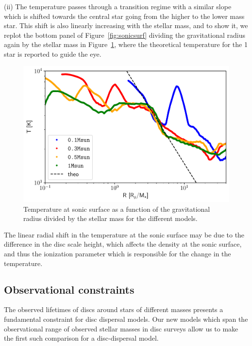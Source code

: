\documentclass[usenatbib,useAMS,usedcolumn]{mnras}
\begin{document}
(ii) The temperature passes through a transition regime with a similar slope which is shifted towards the central star going from the higher to the lower mass star. This shift is also linearly increasing with the stellar mass, and to show it, we replot the bottom panel of Figure~\ref{fig:sonicsurf} dividing the gravitational radius again by the stellar mass in Figure~\ref{fig:sonicsurfrescaled}, where the theoretical temperature for the \SI{1}{\solarmass} star is reported to guide the eye.
\begin{figure}
    \centering
    \includegraphics[width=\columnwidth]{Figure10}
    \caption{Temperature at sonic surface as a function of the gravitational radius divided by the stellar mass for the different models. \label{fig:sonicsurfrescaled}}
\end{figure}
The linear radial shift in the temperature at the sonic surface may be due to the difference in the disc scale height, which affects the density at the sonic surface, and thus the ionization parameter which is responsible for the change in the temperature. 

\subsection{Observational constraints}
The observed lifetimes of discs around stars of different masses presents a fundamental constraint for disc dispersal models. Our new models which span the observational range of observed stellar masses in disc surveys allow us to make the first such comparison for a disc-dispersal model.
\end{document}
